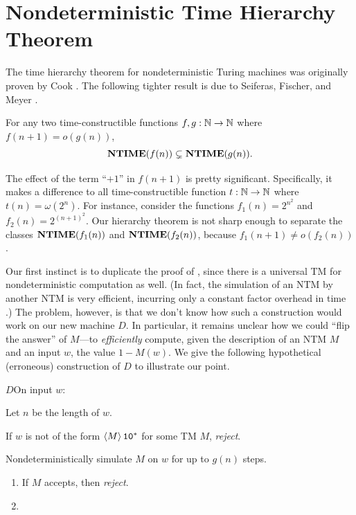 \section{Nondeterministic Time Hierarchy Theorem}
The time hierarchy theorem for nondeterministic Turing machines was originally proven by Cook \cite{cook1972hierarchy}. The following tighter result is due to Seiferas, Fischer, and Meyer \cite{seiferas1978separating}.

\begin{theorem}
  For any two time-constructible functions $f, g : \mathbb N \to \mathbb N$ where $f(n + 1) = o(g(n))$,
  \[ \textbf{NTIME}(f(n)) \subsetneq \textbf{NTIME}(g(n)). \]
\end{theorem}

\begin{remark}
  The effect of the term ``$+ 1$'' in $f(n + 1)$ is pretty significant. Specifically, it makes a difference to all time-constructible function $t : \mathbb N \to \mathbb N$ where $t(n) = \omega(2^n)$. For instance, consider the functions $f_1(n) = 2^{n^2}$ and $f_2(n) = 2^{(n + 1)^2}$. Our hierarchy theorem is not sharp enough to separate the classes $\textbf{NTIME}(f_1(n))$ and $\textbf{NTIME}(f_2(n))$, because $f_1(n + 1) \neq o(f_2(n))$.
\end{remark}

Our first instinct is to duplicate the proof of , since there is a universal TM for nondeterministic computation as well. (In fact, the simulation of an NTM by another NTM is very efficient, incurring only a constant factor overhead in time \cite{arora2009computational}.) The problem, however, is that we don't know how such a construction would work on our new machine $D$. In particular, it remains unclear how we could ``flip the answer'' of $M$—to \emph{efficiently} compute, given the description of an NTM $M$ and an input $w$, the value $1 - M(w)$. We give the following hypothetical (erroneous) construction of $D$ to illustrate our point.

\begin{turing}{$D$}{On input $w$:}
\item Let $n$ be the length of $w$.
\item If $w$ is not of the form $\left< M \right>\texttt{1}\texttt{0}^\ast$ for some TM $M$, \emph{reject}.
\item Nondeterministically simulate $M$ on $w$ for up to $g(n)$ steps.
  \begin{enumerate}[label=\theenumi\arabic*.]
    \item If $M$ accepts, then \emph{reject}.
    \item {}
  \end{enumerate}
\end{turing}

